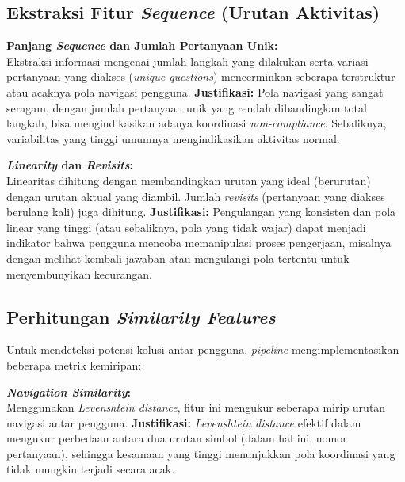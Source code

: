 \subsection{Ekstraksi Fitur \textit{Sequence} (Urutan Aktivitas)}
\label{sec:ekstraksiFiturSequence}
\textbf{Panjang \textit{Sequence} dan Jumlah Pertanyaan Unik:} \\
Ekstraksi informasi mengenai jumlah langkah yang dilakukan serta variasi pertanyaan yang diakses (\textit{unique questions}) mencerminkan seberapa terstruktur atau acaknya pola navigasi pengguna.
\textbf{Justifikasi:} Pola navigasi yang sangat seragam, dengan jumlah pertanyaan unik yang rendah dibandingkan total langkah, bisa mengindikasikan adanya koordinasi \textit{non-compliance}. Sebaliknya, variabilitas yang tinggi umumnya mengindikasikan aktivitas normal.

\textbf{\textit{Linearity} dan \textit{Revisits}:} \\
Linearitas dihitung dengan membandingkan urutan yang ideal (berurutan) dengan urutan aktual yang diambil. Jumlah \textit{revisits} (pertanyaan yang diakses berulang kali) juga dihitung.
\textbf{Justifikasi:} Pengulangan yang konsisten dan pola linear yang tinggi (atau sebaliknya, pola yang tidak wajar) dapat menjadi indikator bahwa pengguna mencoba memanipulasi proses pengerjaan, misalnya dengan melihat kembali jawaban atau mengulangi pola tertentu untuk menyembunyikan kecurangan.

\subsection{Perhitungan \textit{Similarity Features}}
\label{sec:perhitunganSimilarityFeatures}
Untuk mendeteksi potensi kolusi antar pengguna, \textit{pipeline} mengimplementasikan beberapa metrik kemiripan:

\textbf{\textit{Navigation Similarity}:} \\
Menggunakan \textit{Levenshtein distance}, fitur ini mengukur seberapa mirip urutan navigasi antar pengguna.
\textbf{Justifikasi:} \textit{Levenshtein distance} efektif dalam mengukur perbedaan antara dua urutan simbol (dalam hal ini, nomor pertanyaan), sehingga kesamaan yang tinggi menunjukkan pola koordinasi yang tidak mungkin terjadi secara acak.

